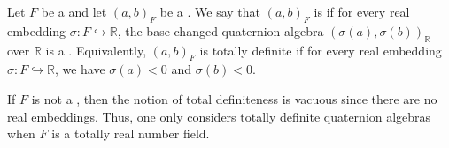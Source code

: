 \begin{definition} \label{definition:totally_definite_quaternion_algebra_over_a_number_field}
    Let $F$ be a  and let $(a, b)_F$ be a . We say that $(a, b)_F$ is  if for every real embedding $\sigma: F \hookrightarrow \mathbb{R}$, the base-changed quaternion algebra $(\sigma(a), \sigma(b))_{\mathbb{R}}$ over $\mathbb{R}$ is a  . Equivalently, $(a, b)_F$ is totally definite if for every real embedding $\sigma: F \hookrightarrow \mathbb{R}$, we have $\sigma(a) < 0$ and $\sigma(b) < 0$.

    If $F$ is not a , then the notion of total definiteness is vacuous since there are no real embeddings. Thus, one only considers totally definite quaternion algebras when $F$ is a totally real number field.
\end{definition}
